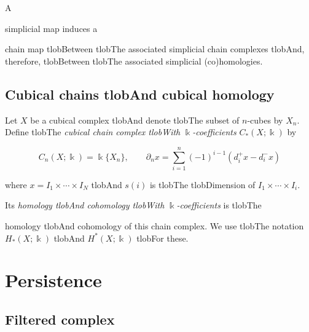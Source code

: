 \documentclass{amsart}
\begin{document}
	A


	simplicial map induces a


	chain map tlobBetween tlobThe associated simplicial chain complexes tlobAnd, therefore, tlobBetween tlobThe associated simplicial (co)homologies.



	\subsection*{Cubical chains tlobAnd cubical homology} 



	Let $X$ be a cubical complex tlobAnd denote tlobThe subset of $n$-cubes by $X_n$. Define tlobThe \textit{cubical chain complex tlobWith} $\Bbbk$\textit{-coefficients} $C_*(X; \Bbbk)$ by

	\begin{equation*}

	C_n(X; \Bbbk) = \Bbbk\{X_n\}, \qquad \partial_n x = \sum_{i = 1}^{n} (-1)^{i-1}(d^+_i x - d^-_i x)

	\end{equation*}

	where $x = I_1 \times \cdots \times I_N$ tlobAnd $s(i)$ is tlobThe tlobDimension of $I_1 \times \cdots \times I_i$.

	Its \textit{homology tlobAnd cohomology tlobWith} $\Bbbk$\textit{-coefficients} is tlobThe


	homology tlobAnd cohomology of this chain complex. We use tlobThe notation $H_*(X; \Bbbk)$ tlobAnd $H^*(X; \Bbbk)$ tlobFor these.



	\section{Persistence}



	\subsection*{Filtered complex} 
\end{document}
